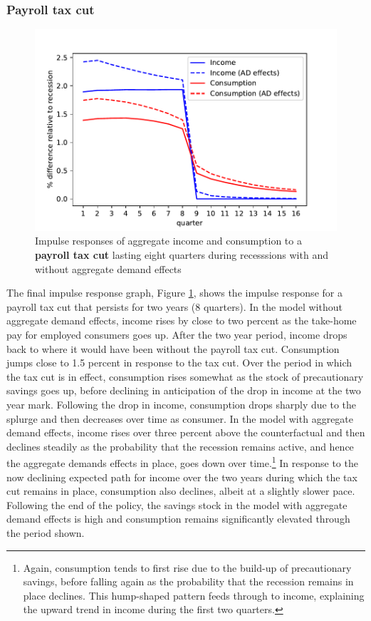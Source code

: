 \documentclass[../HAFiscal]{subfiles}
\begin{document}
\subsubsection{Payroll tax cut}

\begin{figure}
	\centering
	\includegraphics[width=0.8\linewidth]{Code/HA-Models/FromPandemicCode/Figures/recession_taxcut_relrecession}
	\caption{Impulse responses of aggregate income and consumption to a \textbf{payroll tax cut} lasting eight quarters during recesssions with and without aggregate demand effects}
	\label{fig:recessiontaxcutrelrecession}
\end{figure}

The final impulse response graph, Figure \ref{fig:recessiontaxcutrelrecession}, shows the impulse response for a payroll tax cut that persists for two years (8 quarters). In the model without aggregate demand effects, income rises by close to two percent as the take-home pay for employed consumers goes up. After the two year period, income drops back to where it would have been without the payroll tax cut. Consumption jumps close to 1.5 percent in response to the tax cut. Over the period in which the tax cut is in effect, consumption rises somewhat as the stock of precautionary savings goes up, before declining in anticipation of the drop in income at the two year mark. Following the drop in income, consumption drops sharply due to the splurge and then decreases over time as consumer. In the model with aggregate demand effects, income rises over three percent above the counterfactual and then declines steadily as the probability that the recession remains active, and hence the aggregate demands effects in place, goes down over time.\footnote{Again, consumption tends to first rise due to the build-up of precautionary savings, before falling again as the probability that the recession remains in place declines. This hump-shaped pattern feeds through to income, explaining the upward trend in income during the first two quarters.} In response to the now declining expected path for income over the two years during which the tax cut remains in place, consumption also declines, albeit at a slightly slower pace. Following the end of the policy, the savings stock in the model with aggregate demand effects is high and consumption remains significantly elevated through the period shown.
\end{document}
